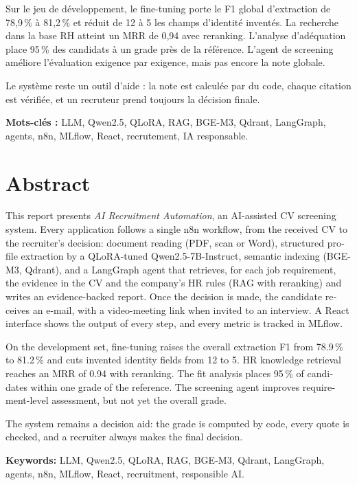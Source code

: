 \documentclass[11pt,a4paper]{report}
\begin{document}
Sur le jeu de développement, le fine-tuning porte le F1 global d'extraction de 78,9\,\% à 81,2\,\% et réduit de 12 à 5 les champs d'identité inventés. La recherche dans la base RH atteint un MRR de 0,94 avec reranking. L'analyse d'adéquation place 95\,\% des candidats à un grade près de la référence. L'agent de screening améliore l'évaluation exigence par exigence, mais pas encore la note globale.

Le système reste un outil d'aide : la note est calculée par du code, chaque citation est vérifiée, et un recruteur prend toujours la décision finale.

\medskip
\noindent\textbf{Mots-clés :} LLM, Qwen2.5, QLoRA, RAG, BGE-M3, Qdrant, LangGraph, agents, n8n, MLflow, React, recrutement, IA responsable.

\chapter*{Abstract}
\begin{otherlanguage}{english}
This report presents \emph{AI Recruitment Automation}, an AI-assisted CV screening system. Every application follows a single n8n workflow, from the received CV to the recruiter's decision: document reading (PDF, scan or Word), structured profile extraction by a QLoRA-tuned Qwen2.5-7B-Instruct, semantic indexing (BGE-M3, Qdrant), and a LangGraph agent that retrieves, for each job requirement, the evidence in the CV and the company's HR rules (RAG with reranking) and writes an evidence-backed report. Once the decision is made, the candidate receives an e-mail, with a video-meeting link when invited to an interview. A React interface shows the output of every step, and every metric is tracked in MLflow.

On the development set, fine-tuning raises the overall extraction F1 from 78.9\,\% to 81.2\,\% and cuts invented identity fields from 12 to 5. HR knowledge retrieval reaches an MRR of 0.94 with reranking. The fit analysis places 95\,\% of candidates within one grade of the reference. The screening agent improves requirement-level assessment, but not yet the overall grade.

The system remains a decision aid: the grade is computed by code, every quote is checked, and a recruiter always makes the final decision.

\medskip
\noindent\textbf{Keywords:} LLM, Qwen2.5, QLoRA, RAG, BGE-M3, Qdrant, LangGraph, agents, n8n, MLflow, React, recruitment, responsible AI.
\end{otherlanguage}
\end{document}
